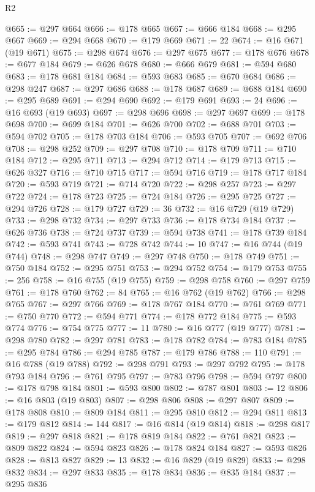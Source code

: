 \begin{lexlean}{R2}
\begin{coremodule}
@665 := @297 @664
@666 := @178 @665
@667 := @666 @184
@668 := @295 @667
@669 := @294 @668
@670 := @179 @669
@671 := 22
@674 := @16 @671 (@19 @671)
@675 := @298 @674
@676 := @297 @675
@677 := @178 @676
@678 := @677 @184
@679 := @626 @678
@680 := @666 @679
@681 := @594 @680
@683 := @178 @681 @184
@684 := @593 @683
@685 := @670 @684
@686 := @298 @247
@687 := @297 @686
@688 := @178 @687
@689 := @688 @184
@690 := @295 @689
@691 := @294 @690
@692 := @179 @691
@693 := 24
@696 := @16 @693 (@19 @693)
@697 := @298 @696
@698 := @297 @697
@699 := @178 @698
@700 := @699 @184
@701 := @626 @700
@702 := @688 @701
@703 := @594 @702
@705 := @178 @703 @184
@706 := @593 @705
@707 := @692 @706
@708 := @298 @252
@709 := @297 @708
@710 := @178 @709
@711 := @710 @184
@712 := @295 @711
@713 := @294 @712
@714 := @179 @713
@715 := @626 @327
@716 := @710 @715
@717 := @594 @716
@719 := @178 @717 @184
@720 := @593 @719
@721 := @714 @720
@722 := @298 @257
@723 := @297 @722
@724 := @178 @723
@725 := @724 @184
@726 := @295 @725
@727 := @294 @726
@728 := @179 @727
@729 := 36
@732 := @16 @729 (@19 @729)
@733 := @298 @732
@734 := @297 @733
@736 := @178 @734 @184
@737 := @626 @736
@738 := @724 @737
@739 := @594 @738
@741 := @178 @739 @184
@742 := @593 @741
@743 := @728 @742
@744 := 10
@747 := @16 @744 (@19 @744)
@748 := @298 @747
@749 := @297 @748
@750 := @178 @749
@751 := @750 @184
@752 := @295 @751
@753 := @294 @752
@754 := @179 @753
@755 := 256
@758 := @16 @755 (@19 @755)
@759 := @298 @758
@760 := @297 @759
@761 := @178 @760
@762 := 84
@765 := @16 @762 (@19 @762)
@766 := @298 @765
@767 := @297 @766
@769 := @178 @767 @184
@770 := @761 @769
@771 := @750 @770
@772 := @594 @771
@774 := @178 @772 @184
@775 := @593 @774
@776 := @754 @775
@777 := 11
@780 := @16 @777 (@19 @777)
@781 := @298 @780
@782 := @297 @781
@783 := @178 @782
@784 := @783 @184
@785 := @295 @784
@786 := @294 @785
@787 := @179 @786
@788 := 110
@791 := @16 @788 (@19 @788)
@792 := @298 @791
@793 := @297 @792
@795 := @178 @793 @184
@796 := @761 @795
@797 := @783 @796
@798 := @594 @797
@800 := @178 @798 @184
@801 := @593 @800
@802 := @787 @801
@803 := 12
@806 := @16 @803 (@19 @803)
@807 := @298 @806
@808 := @297 @807
@809 := @178 @808
@810 := @809 @184
@811 := @295 @810
@812 := @294 @811
@813 := @179 @812
@814 := 144
@817 := @16 @814 (@19 @814)
@818 := @298 @817
@819 := @297 @818
@821 := @178 @819 @184
@822 := @761 @821
@823 := @809 @822
@824 := @594 @823
@826 := @178 @824 @184
@827 := @593 @826
@828 := @813 @827
@829 := 13
@832 := @16 @829 (@19 @829)
@833 := @298 @832
@834 := @297 @833
@835 := @178 @834
@836 := @835 @184
@837 := @295 @836

\end{coremodule}
\end{lexlean}
